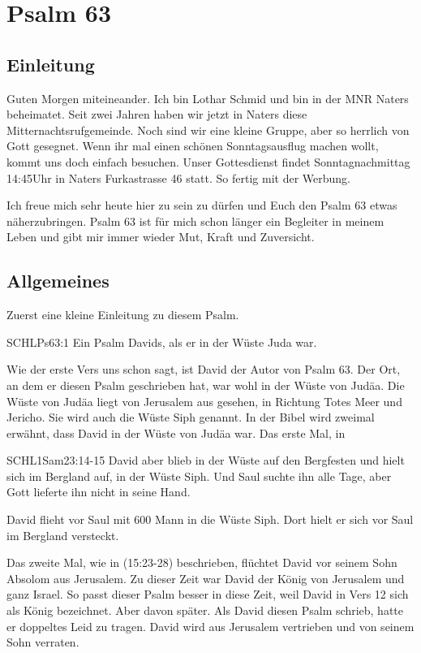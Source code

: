 \documentclass[14pt]{../../inc/mybib}
\author{Lothar Schmid}
\begin{document}
\setlength{\baselineskip}{1.5\baselineskip}

\section*{Psalm 63}
    \subsection*{Einleitung}
    Guten Morgen miteineander. Ich bin Lothar Schmid und bin in der MNR Naters beheimatet. Seit zwei Jahren haben wir jetzt in Naters diese Mitternachtsrufgemeinde. Noch sind wir eine kleine Gruppe, aber so herrlich von Gott gesegnet. Wenn ihr mal einen schönen Sonntagsausflug machen wollt, kommt uns doch einfach besuchen. Unser Gottesdienst findet Sonntagnachmittag 14:45Uhr in Naters Furkastrasse 46 statt. So fertig mit der Werbung.
    
    Ich freue mich sehr heute hier zu sein zu dürfen und Euch den Psalm 63 etwas näherzubringen. Psalm 63 ist für mich schon länger ein Begleiter in meinem Leben und gibt mir immer wieder Mut, Kraft und Zuversicht. 

    \subsection*{Allgemeines}
    \begin{block}[Allgemeines]
    Zuerst eine kleine Einleitung zu diesem Psalm.
        \begin{bibelbox}{SCHL}{Ps}{63:1}
            Ein Psalm Davids, als er in der Wüste Juda war.
        \end{bibelbox}
    Wie der erste Vers uns schon sagt, ist David der Autor von Psalm 63. Der Ort, an dem er diesen Psalm geschrieben hat, war wohl in der Wüste von Judäa. Die Wüste von Judäa liegt von Jerusalem aus gesehen, in Richtung Totes Meer und Jericho. Sie wird auch die Wüste Siph genannt. In der Bibel wird zweimal erwähnt, dass David in der Wüste von Judäa war. Das erste Mal, in     
    \begin{bibelbox}{SCHL}{1Sam}{23:14-15}
        David aber blieb in der Wüste auf den Bergfesten und hielt sich im Bergland auf, in der Wüste Siph. Und Saul suchte ihn alle Tage, aber Gott lieferte ihn nicht in seine Hand.
    \end{bibelbox}    
    David flieht vor Saul mit 600 Mann in die Wüste Siph. Dort hielt er sich vor Saul im Bergland versteckt.
    
    Das zweite Mal, wie in (15:23-28) beschrieben, flüchtet David vor seinem Sohn Absolom aus Jerusalem. Zu dieser Zeit war David der König von Jerusalem und ganz Israel. So passt dieser Psalm besser in diese Zeit, weil David in Vers 12 sich als König bezeichnet. Aber davon später. Als David diesen Psalm schrieb, hatte er doppeltes Leid zu tragen. David wird aus Jerusalem vertrieben und von seinem Sohn verraten.
    \end{block}
\end{document}
